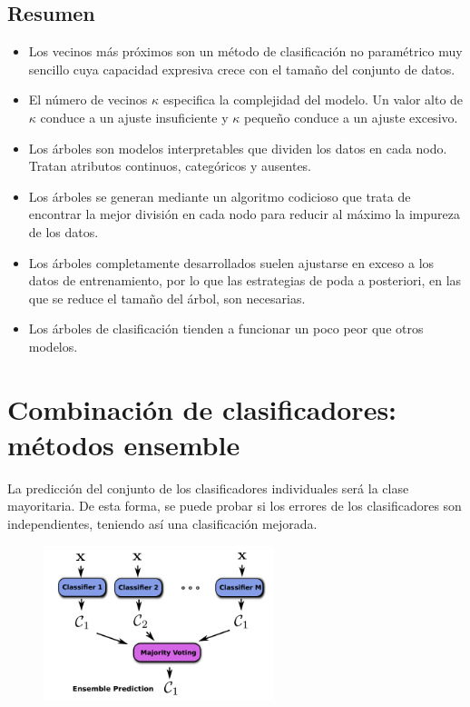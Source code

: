 \subsection{Resumen}
\begin{itemize}
\item Los vecinos más próximos son un método de clasificación no paramétrico muy sencillo cuya capacidad expresiva crece con el tamaño del conjunto de datos.
\item El número de vecinos $\kappa$ especifica la complejidad del modelo. Un valor alto de $\kappa$ conduce a un ajuste insuficiente y $\kappa$ pequeño conduce a un ajuste excesivo.
\item Los árboles son modelos interpretables que dividen los datos en cada nodo. Tratan atributos continuos, categóricos y ausentes.
\item Los árboles se generan mediante un algoritmo codicioso que trata de encontrar la mejor división en cada nodo para reducir al máximo la impureza de los datos.
\item Los árboles completamente desarrollados suelen ajustarse en exceso a los datos de entrenamiento, por lo que las estrategias de poda a posteriori, en las que se reduce el tamaño del árbol, son necesarias. 
\item Los árboles de clasificación tienden a funcionar un poco peor que otros modelos.
\end{itemize} 

\section{Combinación de clasificadores: métodos ensemble}
La predicción del conjunto de los clasificadores individuales será la clase mayoritaria. De esta forma, se puede probar si los errores de los clasificadores son independientes, teniendo así una clasificación mejorada. 

\begin{figure}[h]
\centering
\includegraphics[width = 0.6\textwidth]{figs/majority-voting.png}
\end{figure}

